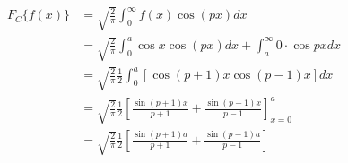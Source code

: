 \begin{answer}
	\begin{align*}
	F_{C}\{f(x)\} &=\sqrt{\frac{2}{\pi}} \int_{0}^{\infty} f(x) \cos (p x) d x \\
	&=\sqrt{\frac{2}{\pi}} \int_{0}^{a} \cos x \cos (p x) d x+\int_{a}^{\infty} 0 \cdot \cos p x d x \\
	&=\sqrt{\frac{2}{\pi}} \frac{1}{2} \int_{0}^{a}[\cos (p+1) x \cos (p-1) x] d x\\
	&=\sqrt{\frac{2}{\pi}} \frac{1}{2}\left[\frac{\sin (p+1) x}{p+1}+\frac{\sin (p-1) x}{p-1}\right]_{x=0}^{a} \\
	&=\sqrt{\frac{2}{\pi}} \frac{1}{2}\left[\frac{\sin (p+1) a}{p+1}+\frac{\sin (p-1) a}{p-1}\right]
	\end{align*}
\end{answer}